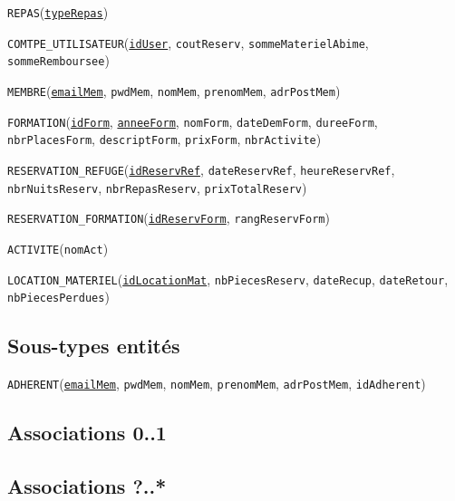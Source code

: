 \documentclass[12pt, a4paper]{article}
\newcommand\att[1]{\textnhtt{#1}}
\begin{document}
\att{REPAS}(\att{\underline{typeRepas}})

\att{COMTPE\_UTILISATEUR}(\att{\underline{idUser}}, \att{coutReserv}, \att{sommeMaterielAbime}, \att{sommeRemboursee})

\att{MEMBRE}(\att{\underline{emailMem}}, \att{pwdMem}, \att{nomMem}, \att{prenomMem}, \att{adrPostMem})

\att{FORMATION}(\att{\underline{idForm}}, \att{\underline{anneeForm}}, \att{nomForm}, \att{dateDemForm}, \att{dureeForm}, \att{nbrPlacesForm}, \att{descriptForm}, \att{prixForm}, \att{nbrActivite})

\att{RESERVATION\_REFUGE}(\att{\underline{idReservRef}}, \att{dateReservRef}, \att{heureReservRef}, \att{nbrNuitsReserv}, \att{nbrRepasReserv}, \att{prixTotalReserv})

\att{RESERVATION\_FORMATION}(\att{\underline{idReservForm}}, \att{rangReservForm})

\att{ACTIVITE}(\att{nomAct})

\att{LOCATION\_MATERIEL}(\att{\underline{idLocationMat}}, \att{nbPiecesReserv}, \att{dateRecup}, \att{dateRetour}, \att{nbPiecesPerdues})

\subsection*{Sous-types entités}

\att{ADHERENT}(\att{\underline{emailMem}}, \att{pwdMem}, \att{nomMem}, \att{prenomMem}, \att{adrPostMem}, \att{idAdherent})




\subsection*{Associations 0..1}

\subsection*{Associations ?..*}

\end{document}
